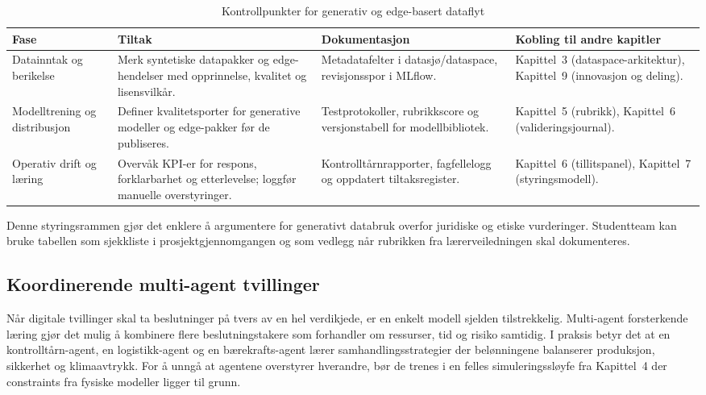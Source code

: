\begin{table}[htbp]
    \centering
    \caption{Kontrollpunkter for generativ og edge-basert dataflyt}
    \label{tab:kontrollpunkter-generativ}
    \begin{tabular}{p{3.6cm}p{4.0cm}p{4.2cm}p{3.8cm}}
        \toprule
        \textbf{Fase} & \textbf{Tiltak} & \textbf{Dokumentasjon} & \textbf{Kobling til andre kapitler} \\
        \midrule
        Datainntak og berikelse & Merk syntetiske datapakker og edge-hendelser med opprinnelse, kvalitet og lisensvilkår. & Metadatafelter i datasjø/dataspace, revisjonsspor i MLflow. & Kapittel~3 (dataspace-arkitektur), Kapittel~9 (innovasjon og deling). \\
        \addlinespace
        Modelltrening og distribusjon & Definer kvalitetsporter for generative modeller og edge-pakker før de publiseres. & Testprotokoller, rubrikkscore og versjonstabell for modellbibliotek. & Kapittel~5 (rubrikk), Kapittel~6 (valideringsjournal). \\
        \addlinespace
        Operativ drift og læring & Overvåk KPI-er for respons, forklarbarhet og etterlevelse; loggfør manuelle overstyringer. & Kontrolltårnrapporter, fagfellelogg og oppdatert tiltaksregister. & Kapittel~6 (tillitspanel), Kapittel~7 (styringsmodell). \\
        \bottomrule
    \end{tabular}
\end{table}

Denne styringsrammen gjør det enklere å argumentere for generativt databruk overfor juridiske og etiske vurderinger. Studentteam kan bruke tabellen som sjekkliste i prosjektgjennomgangen og som vedlegg når rubrikken fra lærerveiledningen skal dokumenteres.

\subsection{Koordinerende multi-agent tvillinger}
Når digitale tvillinger skal ta beslutninger på tvers av en hel verdikjede, er en enkelt modell sjelden tilstrekkelig. Multi-agent forsterkende læring gjør det mulig å kombinere flere beslutningstakere som forhandler om ressurser, tid og risiko samtidig.\citep{zhang2021multiagent} I praksis betyr det at en kontrolltårn-agent, en logistikk-agent og en bærekrafts-agent lærer samhandlingsstrategier der belønningene balanserer produksjon, sikkerhet og klimaavtrykk. For å unngå at agentene overstyrer hverandre, bør de trenes i en felles simuleringssløyfe fra Kapittel~4 der constraints fra fysiske modeller ligger til grunn.

